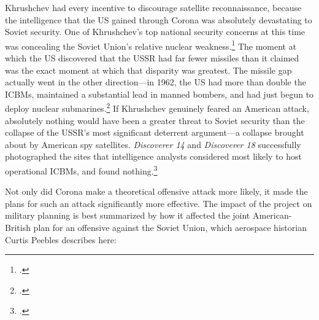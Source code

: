 \documentclass[14pt]{extarticle}
\begin{document}
Khrushchev had every incentive to discourage satellite reconnaissance, because the intelligence that the US gained through Corona was absolutely devastating to Soviet security. One of Khrushchev's top national security concerns at this time was concealing the Soviet Union's relative nuclear weakness.\footcite[p.~133]{brugioni_eyes_2010} The moment at which the US discovered that the USSR had far fewer missiles than it claimed was the exact moment at which that disparity was greatest. The missile gap actually went in the other direction---in 1962, the US had more than double the ICBMs, maintained a substantial lead in manned bombers, and had just begun to deploy nuclear submarines.\footcite[p.~251]{mcdougall_heavens_1985} If Khrushchev genuinely feared an American attack, absolutely nothing would have been a greater threat to Soviet security than the collapse of the USSR's most significant deterrent argument---a collapse brought about by American spy satellites. \emph{Discoverer 14} and \emph{Discoverer 18} successfully photographed the sites that intelligence analysts considered most likely to host operational ICBMs, and found nothing.\footcite[p.~379]{brugioni_eyes_2010}




Not only did Corona make a theoretical offensive attack more likely, it made the plans for such an attack significantly more effective. The impact of the project on military planning is best summarized by how it affected the joint American-British plan for an offensive against the Soviet Union, which aerospace historian Curtis Peebles describes here:
\end{document}
